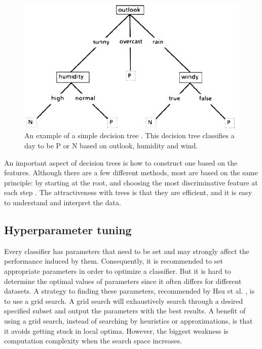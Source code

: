 \documentclass[USenglish]{ifimaster}  %
\begin{document}
	
\begin{figure}[h]
		\centering
		\includegraphics[scale=0.5]{Figures/decisionTree.PNG}
		\caption[An example of decision tree classification]{An example of a simple decision tree \cite{Quinlan1986}. This decision tree classifies a day to be P or N based on outlook, humidity and wind.}
		\label{fig:decisiontree}
\end{figure}
\FloatBarrier

An important aspect of decision trees is how to construct one based on the features. Although there are a few different methods, most are based on the same principle: by starting at the root, and choosing the most discriminative feature at each step \cite{Marsland:2009:MLA:1571643}. The attractiveness with trees is that they are efficient, and it is easy to understand and interpret the data.

\subsection{Hyperparameter tuning}\label{sub:hypt}
Every classifier has parameters that need to be set and may strongly affect the performance induced by them. Consequently, it is recommended to set appropriate parameters in order to optimize a classifier. But it is hard to determine the optimal values of parameters since it often differs for different datasets. A strategy to finding these parameters, recommended by Hsu et al. \cite{Hsu10apractical}, is to use a grid search. A grid search will exhaustively search through a desired specified subset and output the parameters with the best results. A benefit of using a grid search, instead of searching by heuristics or approximations, is that it avoids getting stuck in local optima. However, the biggest weakness is computation complexity when the search space increases.
\end{document}
